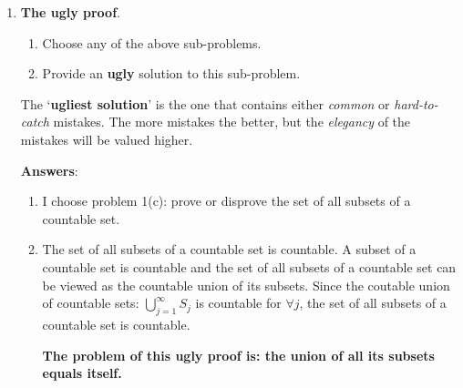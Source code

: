 \documentclass{article}%
\begin{document}
\begin{enumerate}
	\item \textbf{The ugly proof}.
	\begin{enumerate}
	\item Choose any of the above sub-problems.
	\item Provide an \textbf{ugly} solution to this sub-problem.
	\end{enumerate}
	The `\textbf{ugliest solution}' is the one that contains either \textsl{common} or \textsl{hard-to-catch} mistakes. 
	The more mistakes the better, but the \textsl{elegancy} of the mistakes will be valued higher.
	
	\textbf{Answers}:
	
\begin{enumerate}
	\item I choose problem 1(c): prove or disprove the set of all subsets of a countable set.
	\item The set of all subsets of a countable set is countable. A subset of a countable set is countable and the set of all subsets of a countable set can be viewed as the countable union of its subsets. Since the coutable union of countable sets: $\bigcup _{j=1}^{\infty}S_j$ is countable for $\forall j$, the set of all subsets of a countable set is countable. 
	
	\textbf{The problem of this ugly proof is: the union of all its subsets equals itself.}
\end{enumerate}
	
\end{enumerate}
\end{document}
